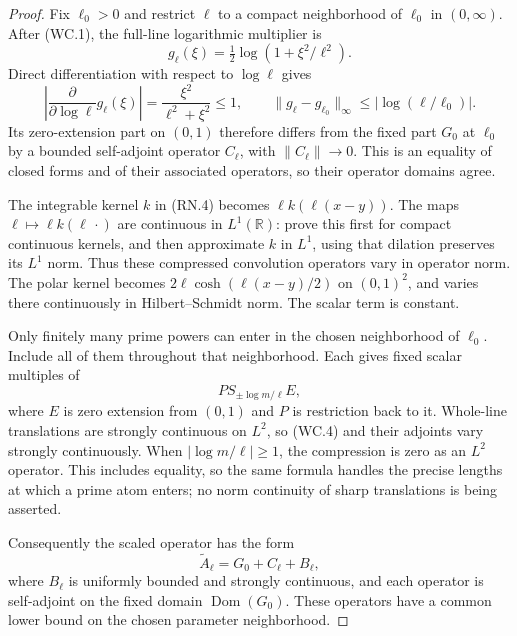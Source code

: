 \begin{proof}
Fix \(\ell_0>0\) and restrict \(\ell\) to a compact
neighborhood of \(\ell_0\) in \((0,\infty)\).
After (WC.1), the full-line logarithmic multiplier is
\[
                  g_\ell(\xi)=\tfrac12
                            \log(1+\xi^2/\ell^2).
\]
Direct differentiation with respect to \(\log\ell\) gives
\[
 \left|\frac{\partial}{\partial\log\ell}g_\ell(\xi)\right|
                =\frac{\xi^2}{\ell^2+\xi^2}\leq1,
 \qquad
 \|g_\ell-g_{\ell_0}\|_\infty
                        \leq|\log(\ell/\ell_0)|.        \tag{WC.3}
\]
Its zero-extension part on \((0,1)\) therefore differs
from the fixed part \(G_0\) at \(\ell_0\) by a bounded
self-adjoint operator \(C_\ell\), with
\(\|C_\ell\|\to0\).
This is an equality of closed forms and of their associated
operators, so their operator domains agree.

The integrable kernel \(k\) in (RN.4) becomes
\(\ell k(\ell(x-y))\).
The maps \(\ell\mapsto\ell k(\ell\,\cdot)\) are
continuous in \(L^1(\mathbb R)\): prove this first for
compact continuous kernels, and then approximate \(k\)
in \(L^1\), using that dilation preserves its \(L^1\) norm.
Thus these compressed convolution operators vary in operator
norm.  The polar kernel becomes
\(2\ell\cosh(\ell(x-y)/2)\) on \((0,1)^2\), and varies
there continuously in Hilbert--Schmidt norm.
The scalar term is constant.

Only finitely many prime powers can enter in the chosen
neighborhood of \(\ell_0\).  Include all of them throughout
that neighborhood.  Each gives fixed scalar multiples of
\[
                   P S_{\pm\log m/\ell}E,                \tag{WC.4}
\]
where \(E\) is zero extension from \((0,1)\) and \(P\)
is restriction back to it.
Whole-line translations are strongly continuous on \(L^2\),
so (WC.4) and their adjoints vary strongly continuously.
When \(|\log m/\ell|\geq1\), the compression is zero
as an \(L^2\) operator.  This includes equality, so the
same formula handles the precise lengths at which a prime
atom enters; no norm continuity of sharp translations is
being asserted.

Consequently the scaled operator has the form
\[
                  \widetilde A_\ell
                    =G_0+C_\ell+B_\ell,                 \tag{WC.5}
\]
where \(B_\ell\) is uniformly bounded and strongly
continuous, and each operator is self-adjoint on the fixed
domain \(\operatorname{Dom}(G_0)\).
These operators have a common lower bound on the chosen
parameter neighborhood.


\end{proof}
